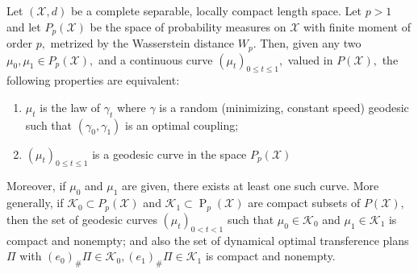 \begin{thm}
	\label{geodesic_Wasserstein_space}
	Let \( ( \mathcal { X } , d ) \) be a complete separable, locally compact length space. Let \( p > 1 \) and let \( P _ { p } ( \mathcal { X } ) \) be the space of probability measures on \( \mathcal { X } \) with finite moment of order \( p , \) metrized by the Wasserstein distance \( W _ { p } . \) Then, given any two \( \mu _ { 0 } , \mu _ { 1 } \in P _ { p } ( \mathcal { X } ) , \) and a continuous curve \( \left( \mu _ { t } \right) _ { 0 \leq t \leq 1 } , \) valued in \( P ( \mathcal { X } ) , \) the following properties are equivalent:
	\begin{enumerate}
		\item \( \mu _ { t } \) is the law of \(\gamma _ { t } \) where \( \gamma \) is a random (minimizing, constant speed) geodesic such that \( \left( \gamma _ { 0 } , \gamma _ { 1 } \right) \) is an optimal coupling;
		\item \( \left( \mu _ { t } \right) _ { 0 \leq t \leq 1 } \) is a geodesic curve in the space \( P _ { p } ( \mathcal { X } ) \)
	\end{enumerate}
	Moreover, if \( \mu _ { 0 } \) and \( \mu _ { 1 } \) are given, there exists at least one such curve.
	More generally, if \( \mathcal { K } _ { 0 } \subset P _ { p } ( \mathcal { X } ) \) and \( \mathcal { K } _ { 1 } \subset \operatorname { P } _ { p } ( \mathcal { X } ) \) are compact subsets of
	\( P ( \mathcal { X } ) , \) then the set of geodesic curves \( \left( \mu _ { t } \right) _ { 0 < t < 1 } \) such that \( \mu _ { 0 } \in \mathcal { K } _ { 0 } \) and
	\( \mu _ { 1 } \in \mathcal { K } _ { 1 } \) is compact and nonempty; and also the set of dynamical optimal transference plans \( \Pi \) with \( \left( e _ { 0 } \right) _ { \# } \Pi \in \mathcal { K } _ { 0 } , \left( e _ { 1 } \right) _ { \# } \Pi \in \mathcal { K } _ { 1 } \) is compact
	and nonempty.
\end{thm}

